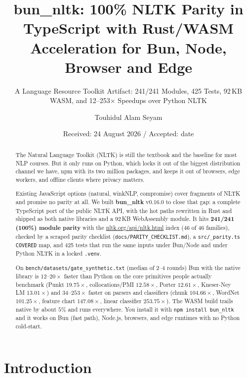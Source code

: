 \documentclass[smallextended]{svjour3}
\title{bun\_nltk: 100\% NLTK Parity in TypeScript with Rust/WASM Acceleration for Bun, Node, Browser and Edge}
\subtitle{A Language Resource Toolkit Artifact: 241/241 Modules, 425 Tests, 92\,KB WASM, and 12--253$\times$ Speedups over Python NLTK}
\author{Touhidul Alam Seyam}
\institute{BGC Trust University Bangladesh, Chattogram \at \email{touhidulalam@bgctub.ac.bd} \\ ORCID 0009-0007-7512-1893}
\date{Received: 24 August 2026 / Accepted: date}
\begin{document}
\maketitle

\begin{abstract}
The Natural Language Toolkit (NLTK) is still the textbook and the baseline for most NLP courses. But it only runs on Python, which locks it out of the biggest distribution channel we have, npm with its two million packages, and keeps it out of browsers, edge workers, and offline clients where privacy matters.

Existing JavaScript options (natural, winkNLP, compromise) cover fragments of NLTK and promise no parity at all. We built \textbf{bun\_nltk} v0.16.0 to close that gap: a complete TypeScript port of the public NLTK API, with the hot paths rewritten in Rust and shipped as both native libraries and a 92\,KB WebAssembly module. It hits \textbf{241/241 (100\%) module parity} with the \url{nltk.org/api/nltk.html} index (46 of 46 families), checked by a scraped parity checklist (\texttt{docs/PARITY\_CHECKLIST.md}), a \texttt{src/\_parity.ts} \texttt{COVERED} map, and 425 tests that run the same inputs under Bun/Node and under Python NLTK in a locked \texttt{.venv}.

On \texttt{bench/datasets/gate\_synthetic.txt} (median of 2--4 rounds) Bun with the native library is $12\text{--}20\times$ faster than Python on the core primitives people actually benchmark (Punkt $19.75\times$, collocations/PMI $12.58\times$, Porter $12.61\times$, Kneser-Ney LM $13.01\times$) and $34\text{--}253\times$ faster on parsers and classifiers (chunk $104.66\times$, WordNet $101.25\times$, feature chart $147.08\times$, linear classifier $253.75\times$). The WASM build trails native by about $5\%$ and runs everywhere. You install it with \texttt{npm install bun\_nltk} and it works on Bun (fast path), Node.js, browsers, and edge runtimes with no Python cold-start.

\end{abstract}

\section{Introduction}
\label{sec:intro}
\end{document}
